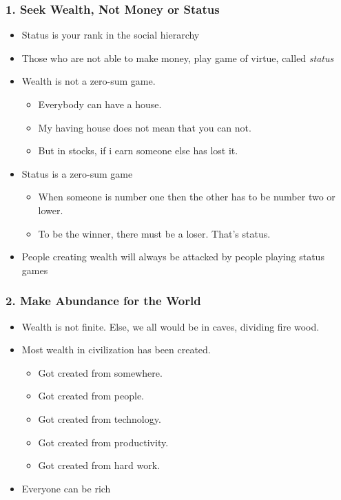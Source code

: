 \begin{frame}[fragile]
\frametitle{1. Seek Wealth, Not Money or Status}
\begin{itemize}
\item Status is your rank in the social hierarchy
\item Those who are not able to make money, play game of virtue, called {\it status}
\item Wealth is not a zero-sum game. 
\begin{itemize}
\item Everybody can have a house. 
\item My having house does not mean that you can not. 
\item But in stocks, if i earn someone else has lost it.
\end{itemize}
\item Status is a zero-sum game
\begin{itemize}
\item When someone is number one then the other has to be number two or lower. 
\item  To be the winner, there must be a loser. That's status.
\end{itemize}
\item People creating wealth will always be attacked by people playing status games
\end{itemize}
\end{frame}

\begin{frame}[fragile]
\frametitle{2. Make Abundance for the World}
\begin{itemize}
\item Wealth is not finite. Else, we all would be in caves, dividing fire wood.
\item Most wealth in civilization has been created.
\begin{itemize}
\item Got created from somewhere. 
\item Got created from people. 
\item Got created from technology. 
\item Got created from productivity. 
\item Got created from hard work.
\end{itemize}
\item Everyone can be rich
\end{itemize}
\end{frame}

